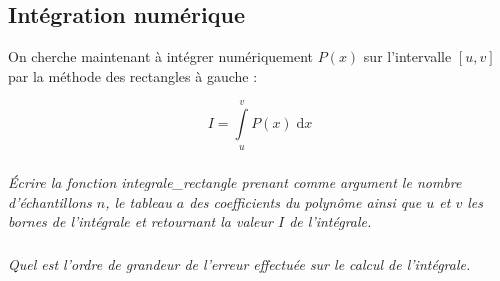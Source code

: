 \documentclass[10pt]{article}
\begin{document}
\subsection*{Intégration numérique}
On cherche maintenant à intégrer numériquement $P(x)$ sur l'intervalle $[u,v]$ par la méthode des rectangles à gauche :

$$
I = \int\limits_{u}^{v} P(x) \; \mathrm{d}x
$$

\subparagraph{}
\textit{Écrire la fonction \textsf{integrale\_rectangle} prenant comme argument le nombre d'échantillons $n$, le tableau $a$ des coefficients du polynôme ainsi que $u$ et $v$ les bornes de l'intégrale et retournant la valeur $I$ de l'intégrale. }
\subparagraph{}
\textit{Quel est l'ordre de grandeur de l'erreur effectuée sur le calcul de l'intégrale.}
\end{document}
